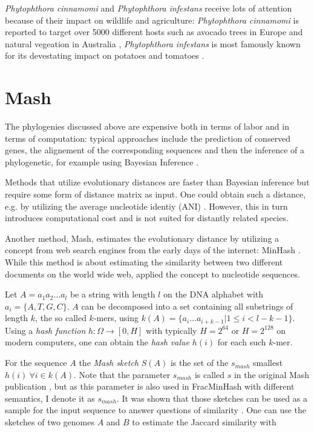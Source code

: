 \textit{Phytophthora cinnamomi} and \textit{Phytophthora infestans} receive lots
of attention because of their impact on wildlife and agriculture:
\textit{Phytophthora cinnamomi} is reported to target over 5000 different hosts
such as avocado trees in Europe and natural vegeation in Australia
\cite{hardhamPhytophthoraCinnamomi2018,solis-garciaPhytophthoraRootRot2020},
\textit{Phytophthora infestans} is most famously known for its devestating
impact on potatoes and tomatoes \cite{ayala-usmaWholeGenomeDuplication2021}.


\section{Mash}
The phylogenies discussed above are expensive both in terms of labor and in
terms of computation: typical approaches include the prediction of conserved
genes, the alignement of the corresponding sequences and then the inference of a
phylogenetic, for example using Bayesian Inference
\cite{abadPhytophthoraTaxonomicPhylogenetic2023a,winkworthComparativeAnalysesComplete2022}.

Methods that utilize evolutionary distances
\cite{saitouNeighborjoiningMethodNew1987} are faster  than Bayesian
inference but require some form of distance matrix as input. One could obtain
such a distance, e.g. by utilizing the average nucleotide identiy (ANI)
\cite{leeOrthoANIImprovedAlgorithm2016}. However, this in turn introduces
computational cost and is not suited for distantly related species.

Another method, Mash, estimates the evolutionary distance by utilizing a concept
from web search engines from the early days of the internet: MinHash
\cite{broderResemblanceContainmentDocuments1998a,ondovMashFastGenome2016}. While
this method is about estimating the similarity between two different documents
on the world wide web,  applied the concept
to nucleotide sequences.

Let $A = a_1 a_2 \dots a_l$ be a string with length $l$ on the DNA alphabet with
$a_i = \{A, T, G, C\}$. $A$ can be decomposed into a set containing all
substrings of length $k$, the so called $k$-mers, using $k(A) = \{a_i \dots
a_{i+k-1} | 1 \leq i < l-k-1\}$. Using a \textit{hash function} $h: \Omega
\rightarrow [0, H]$ with typically $H=2^{64}$ or $H=2^{128}$ on modern
computers, one can obtain the \textit{hash value} $h(i)$ for each such $k$-mer.

For the sequence $A$ the \textit{Mash sketch} $S(A)$ is the set of the
$s_{mash}$ smallest $h(i) ~ \forall i \in k(A)$. Note that the parameter
$s_{mash}$ is called $s$ in the original Mash publication
\cite{ondovMashFastGenome2016}, but as this parameter is also used in
FracMinHash with different semantics, I denote it as $s_{mash}$. It was shown
that those sketches can be used as a sample for the input sequence to answer
questions of similarity \cite{ondovMashFastGenome2016}. One can use the sketches
of two genomes $A$ and $B$ to estimate the Jaccard similarity with 

